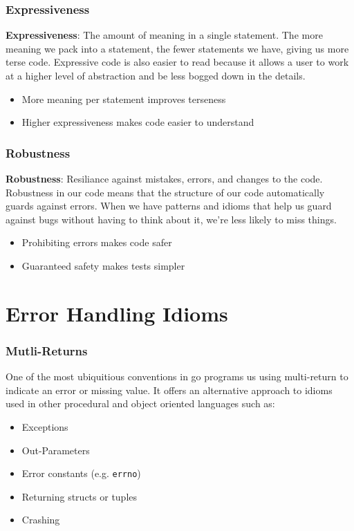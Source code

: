 \documentclass{beamer}
\begin{document}
\begin{frame}
  \frametitle{Expressiveness}
  {\bf Expressiveness}: The amount of meaning in a single statement.
  \vfill
  The more meaning we pack into a statement, the fewer statements we
  have, giving us more terse code.  Expressive code is also easier to
  read because it allows a user to work at a higher level of
  abstraction and be less bogged down in the details.
  \vfill
  \begin{itemize}
  \item More meaning per statement improves terseness
  \item Higher expressiveness makes code easier to understand
  \end{itemize}
\end{frame}

\begin{frame}
  \frametitle{Robustness}
  {\bf Robustness}: Resiliance against mistakes, errors, and changes to the code.
  \vfill
  Robustness in our code means that the structure of our code
  automatically guards against errors.  When we have patterns and
  idioms that help us guard against bugs without having to think about
  it, we're less likely to miss things.
  \vfill
  \begin{itemize}
  \item Prohibiting errors makes code safer
  \item Guaranteed safety makes tests simpler
  \end{itemize}
\end{frame}

\section{Error Handling Idioms}

\begin{frame}[fragile]
  \frametitle{Mutli-Returns}
  One of the most ubiquitious conventions in go programs us using
  multi-return to indicate an error or missing value.  It offers an
  alternative approach to idioms used in other procedural and object
  oriented languages such as:
  \vfill
  \begin{itemize}
  \item Exceptions
  \item Out-Parameters
  \item Error constants (e.g. \verb!errno!)
  \item Returning structs or tuples
  \item Crashing
  \end{itemize}
\end{frame}
\end{document}
